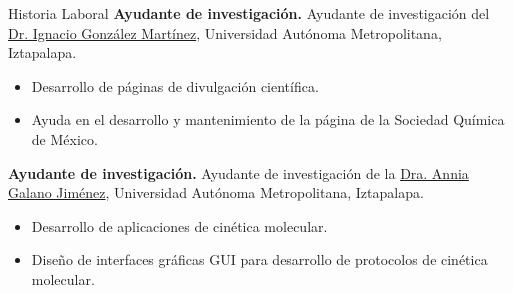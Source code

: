 
\begin{rubric}{Historia Laboral}
	\entry*[2020 -- 2023]%
	\textbf{Ayudante de investigación.} Ayudante de investigación del \href{http://quimica.izt.uam.mx/profesores/dr-ignacio-gonzalez-martinez/}{Dr. Ignacio González Martínez}, Universidad Autónoma Metropolitana, Iztapalapa.
	\begin{itemize}
		\item Desarrollo de páginas de divulgación científica.
		\item Ayuda en el desarrollo y mantenimiento de la página de la Sociedad Química de México.
	\end{itemize}

	\entry*[2017 -- 2020]%
	\textbf{Ayudante de investigación.} Ayudante de investigación de la \href{https://agalano.com/}{Dra. Annia Galano Jiménez},  Universidad Autónoma Metropolitana, Iztapalapa.
	\begin{itemize}
		\item Desarrollo de aplicaciones de cinética molecular.
		\item Diseño de interfaces gráficas GUI para desarrollo de protocolos de cinética molecular.
	\end{itemize}
\end{rubric}

